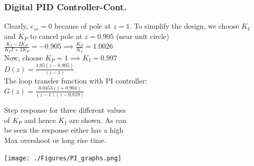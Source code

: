 \documentclass[mathserif, 10pt]{beamer} %
\begin{document}
\frame
{

\small
\frametitle{Digital PID Controller-Cont.}

Clearly, $e_{ss} = 0$ because of pole at $z=1$. To simplify the design, we choose $K_I$ and $K_P$ to cancel pole at $z=0.905$ (near unit circle)\\ \vspace{.07in}
$\frac{K_I-2K_P}{K_IT+2K_P} = -0.905 \implies \frac{K_P}{K_I} = 1.0026$\\ \vspace{.1in}
Now, choose $K_P = 1 \implies K_I = 0.997$\\ \vspace{.07in}
$D(z) = \frac{1.05(z-0.905)}{(z-1)}$\\ \vspace{.07in}
The loop transfer function with PI controller:\\ \vspace{.07in}
$G(z) =\frac{0.0453(z+0.904)}{(z-1)(z-0.819)}$ \\ \vspace{.07in}

Step response for three different values \\
 of $K_P$ and hence $K_I$ are shown. As can \\
 be seen the response either has a high \\
 Max overshoot or long rise  time. \\ \vspace{.07in}


\vspace{-.65in}
\hspace{2.25in}
\texttt{[image: ./Figures/PI\_graphs.png]}

}
\end{document}
